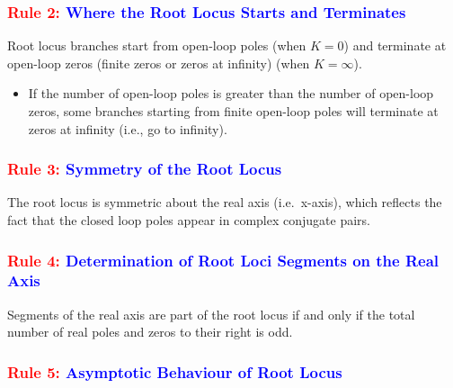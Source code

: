 \documentclass[
  14pt,
  a4paper,
  oneside,
  open=any,
  a4paper,
  14pt]{report}
\providecommand{\tightlist}{%
  \setlength{\itemsep}{0pt}\setlength{\parskip}{0pt}}\usepackage{longtable,booktabs,array}
\begin{document}
\subsubsection*{\texorpdfstring{\textcolor{red}{Rule 2:}
\textcolor{blue}{Where the Root Locus Starts and
Terminates}}{Rule 2: Where the Root Locus Starts and Terminates}}\label{rule-2-where-the-root-locus-starts-and-terminates}

Root locus branches start from open-loop poles (when \(K=0\)) and
terminate at open-loop zeros (finite zeros or zeros at infinity) (when
\(K=\infty\)).

\begin{itemize}
\tightlist
\item
  If the number of open-loop poles is greater than the number of
  open-loop zeros, some branches starting from finite open-loop poles
  will terminate at zeros at infinity (i.e., go to infinity).
\end{itemize}

\subsubsection*{\texorpdfstring{\textcolor{red}{Rule 3:}
\textcolor{blue}{Symmetry of the Root
Locus}}{Rule 3: Symmetry of the Root Locus}}\label{rule-3-symmetry-of-the-root-locus}

The root locus is symmetric about the real axis (i.e.~x-axis), which
reflects the fact that the closed loop poles appear in complex conjugate
pairs.

\subsubsection*{\texorpdfstring{\textcolor{red}{Rule 4:}
\textcolor{blue}{Determination of Root Loci Segments on the Real
Axis}}{Rule 4: Determination of Root Loci Segments on the Real Axis}}\label{rule-4-determination-of-root-loci-segments-on-the-real-axis}

Segments of the real axis are part of the root locus if and only if the
total number of real poles and zeros to their right is odd.

\subsubsection*{\texorpdfstring{\textcolor{red}{Rule 5:}
\textcolor{blue}{Asymptotic Behaviour of Root
Locus}}{Rule 5: Asymptotic Behaviour of Root Locus}}\label{rule-5-asymptotic-behaviour-of-root-locus}
\end{document}

